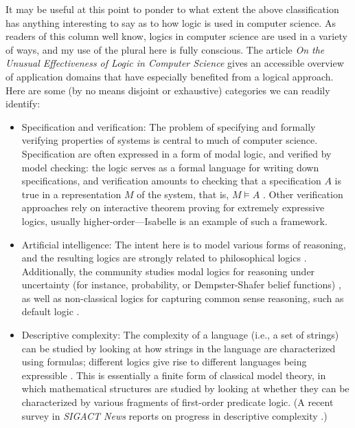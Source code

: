 \documentclass[11pt]{article}
\newcommand{\sat}{\models}
\newcommand{\<}{\langle}
\renewcommand{\>}{\rangle}
\begin{document}
It may be useful at this point to ponder to what extent the above
classification has anything interesting to say as to how logic is used
in computer science. 
As readers of this column well know, logics in computer science are
used in a variety of ways, and my use of the plural here is fully
conscious.
The article \emph{On the Unusual Effectiveness of Logic in Computer
Science} \cite{r:halpern01d} gives an accessible overview of
application domains that have especially benefited from a logical
approach.
 Here are some (by no means disjoint or exhaustive) categories we can
readily identify:
\begin{itemize}
\item Specification and verification: The problem of specifying
 and formally verifying properties of systems is central to much of
 computer science. 
 Specification are often expressed in a form of modal logic, and
 verified by model checking: the logic serves as a formal language for
 writing down specifications, and verification amounts to checking
 that a specification $A$ is true in a representation $M$ of the
 system, that is, $M\sat A$ \cite{r:clarke99,r:huth99}. 
 Other verification approaches rely on interactive theorem proving for
 extremely expressive logics, usually higher-order---Isabelle
 \cite{r:paulson94} is an example of such a framework.

\item Artificial intelligence: The intent here is to model various
forms of reasoning, and the resulting logics are strongly related to
philosophical logics \cite{r:ramsay88}.
Additionally, the community studies modal logics for reasoning under
uncertainty (for instance, probability, or Dempster-Shafer belief
functions) \cite{r:halpern03e}, as well as non-classical logics for
capturing common sense reasoning, such as default logic
\cite{r:reiter78}.

\item Descriptive complexity: The complexity of a language (i.e., a
set of strings) can be studied by looking at how strings in the
language are characterized using formulas; different logics 
give rise to different languages being expressible
\cite{r:ebbinghaus95,r:immerman98,r:libkin04}. 
This is essentially a finite form of classical model theory, in which
mathematical structures are studied by looking at whether they can be
characterized by various fragments of first-order predicate logic. 
(A recent survey in \emph{SIGACT News} reports on progress in descriptive
complexity \cite{r:immerman05}.)


\end{itemize}
\end{document}

